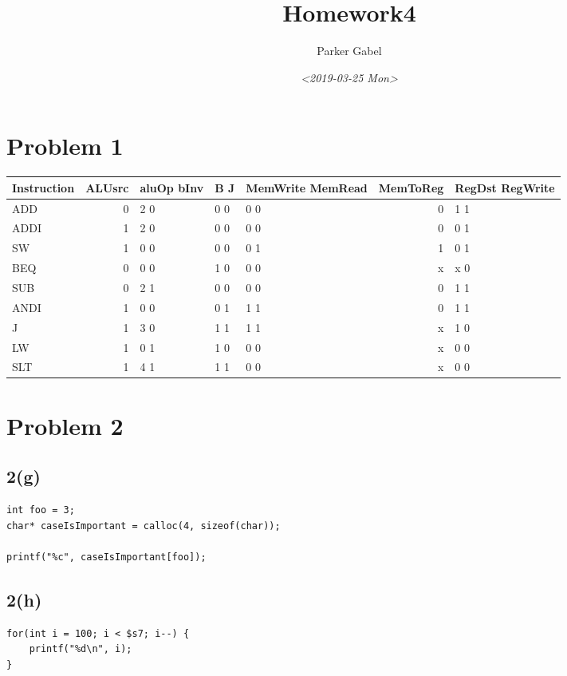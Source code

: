 \documentclass[11pt]{article}
\author{Parker Gabel}
\date{\textit{<2019-03-25 Mon>}}
\title{Homework4}
\begin{document}
\maketitle
\section{Problem 1}
\label{sec:org8e73627}
\begin{center}
\begin{tabular}{lrlllrl}
Instruction & ALUsrc & aluOp bInv & B J & MemWrite MemRead & MemToReg & RegDst RegWrite\\
\hline
ADD & 0 & 2    0 & 0 0 & 0        0 & 0 & 1       1\\
ADDI & 1 & 2    0 & 0 0 & 0        0 & 0 & 0       1\\
SW & 1 & 0    0 & 0 0 & 0        1 & 1 & 0       1\\
BEQ & 0 & 0    0 & 1 0 & 0        0 & x & x       0\\
SUB & 0 & 2    1 & 0 0 & 0        0 & 0 & 1       1\\
ANDI & 1 & 0    0 & 0 1 & 1        1 & 0 & 1       1\\
J & 1 & 3    0 & 1 1 & 1        1 & x & 1       0\\
LW & 1 & 0    1 & 1 0 & 0        0 & x & 0       0\\
SLT & 1 & 4    1 & 1 1 & 0        0 & x & 0       0\\
\end{tabular}
\end{center}
\section{Problem 2}
\label{sec:orgf6bff24}
\subsection{2(g)}
\label{sec:org845870e}
\begin{verbatim}
int foo = 3;
char* caseIsImportant = calloc(4, sizeof(char));

printf("%c", caseIsImportant[foo]);
\end{verbatim}
\subsection{2(h)}
\label{sec:org894e2a7}
\begin{verbatim}
for(int i = 100; i < $s7; i--) {
    printf("%d\n", i);
}
\end{verbatim}
\end{document}
